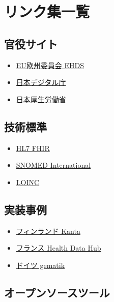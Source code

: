 \documentclass[
  a4paper,
  a4paper,
  11pt]{ltjsbook}
\providecommand{\tightlist}{%
  \setlength{\itemsep}{0pt}\setlength{\parskip}{0pt}}
\begin{document}
\section{リンク集一覧}\label{ux30eaux30f3ux30afux96c6ux4e00ux89a7}

\subsection{官役サイト}\label{ux5b98ux5f79ux30b5ux30a4ux30c8}

\begin{itemize}
\tightlist
\item
  \href{https://digital-strategy.ec.europa.eu/en/policies/european-health-data-space}{EU欧州委員会
  EHDS}
\item
  \href{https://www.digital.go.jp/}{日本デジタル庁}
\item
  \href{https://www.mhlw.go.jp/}{日本厚生労働省}
\end{itemize}

\subsection{技術標準}\label{ux6280ux8853ux6a19ux6e96}

\begin{itemize}
\tightlist
\item
  \href{https://hl7.org/fhir/}{HL7 FHIR}
\item
  \href{https://www.snomed.org/}{SNOMED International}
\item
  \href{https://loinc.org/}{LOINC}
\end{itemize}

\subsection{実装事例}\label{ux5b9fux88c5ux4e8bux4f8b}

\begin{itemize}
\tightlist
\item
  \href{https://www.kanta.fi/en}{フィンランド Kanta}
\item
  \href{https://www.health-data-hub.fr/}{フランス Health Data Hub}
\item
  \href{https://www.gematik.de/}{ドイツ gematik}
\end{itemize}

\subsection{オープンソースツール}\label{ux30aaux30fcux30d7ux30f3ux30bdux30fcux30b9ux30c4ux30fcux30eb}
\end{document}

